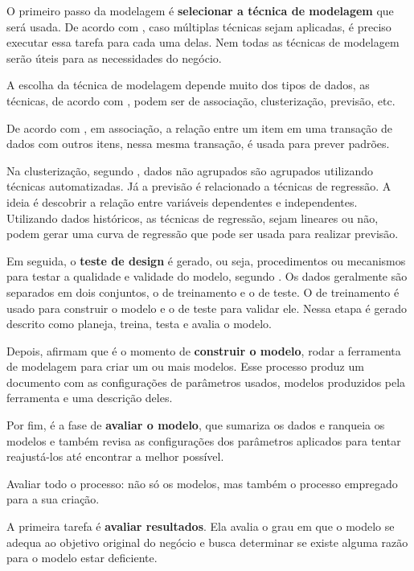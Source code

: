O primeiro passo da modelagem é \textbf{selecionar a técnica de modelagem} que será usada. De acordo com , caso múltiplas técnicas sejam aplicadas, é preciso executar essa tarefa para cada uma delas. Nem todas as técnicas de modelagem serão úteis para as necessidades do negócio.

A escolha da técnica de modelagem depende muito dos tipos de dados, as técnicas, de acordo com , podem ser de associação, clusterização, previsão, etc.

De acordo com , em associação, a relação entre um item em uma transação de dados com outros itens, nessa mesma transação, é usada para prever padrões.

Na clusterização, segundo , dados não agrupados são agrupados utilizando técnicas automatizadas. Já a previsão é relacionado a técnicas de regressão. A ideia é descobrir a relação entre variáveis dependentes e independentes. Utilizando dados históricos, as técnicas de regressão, sejam lineares ou não, podem gerar uma curva de regressão que pode ser usada para realizar previsão.

Em seguida, o \textbf{teste de design} é gerado, ou seja, procedimentos ou mecanismos para testar a qualidade e validade do modelo, segundo  . Os dados geralmente são separados em dois conjuntos, o de treinamento e o de teste. O de treinamento é usado para construir o modelo e o de teste para validar ele. Nessa etapa é gerado descrito como planeja, treina, testa e avalia o modelo.

Depois,  afirmam que é o momento de \textbf{construir o modelo}, rodar a ferramenta de modelagem para criar um ou mais modelos. Esse processo produz um documento com as configurações de parâmetros usados, modelos produzidos pela ferramenta e uma descrição deles.

Por fim, é a fase de \textbf{avaliar o modelo}, que sumariza os dados e ranqueia os modelos e também revisa as configurações dos parâmetros aplicados para tentar reajustá-los até encontrar a melhor possível.

Avaliar todo o processo: não só os modelos, mas também o processo empregado para a sua criação.

A primeira tarefa é \textbf{avaliar resultados}. Ela avalia o grau em que o modelo se adequa ao objetivo original do negócio e busca determinar se existe alguma razão para o modelo estar deficiente.

